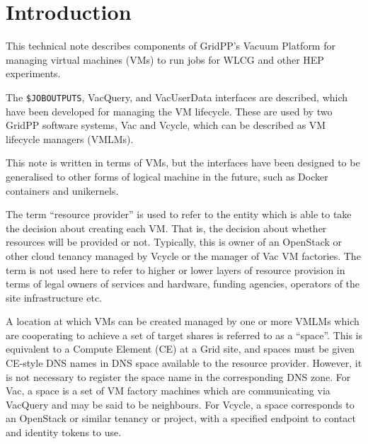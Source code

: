 \documentclass[12pt,a4paper]{article}
\begin{document}
\cleardoublepage

\renewcommand{\thefootnote}{\arabic{footnote}}
\setcounter{footnote}{0}


\pagestyle{plain} %
\setcounter{page}{1}

\linenumbers

\section{Introduction}
\label{sec:Introduction}

This technical note describes components of GridPP's Vacuum Platform for 
managing virtual machines (VMs) to run jobs for WLCG and other HEP 
experiments.

The \texttt{\$JOBOUTPUTS}, VacQuery, and VacUserData interfaces are described, 
which have been developed for managing the VM lifecycle. These are used 
by two GridPP software systems, Vac and Vcycle, which can be described 
as VM lifecycle managers (VMLMs).

This note is written in terms of VMs, but the interfaces have been 
designed to be generalised to other forms of logical machine in the
future, such as Docker containers and unikernels.

The term ``resource provider'' is used to refer to the entity which is 
able to take the decision about creating each VM. That is, the decision 
about whether resources will be provided or not. Typically, this is owner 
of an OpenStack or other cloud tenancy managed by Vcycle or the manager of Vac VM 
factories. The term is not used here to refer to higher or lower layers of resource
provision in terms of legal owners of services and hardware, funding
agencies, operators of the site infrastructure etc.

A location at which VMs can be created managed by one or more VMLMs
which are cooperating to achieve a set of target shares is referred to
as a ``space''. This is equivalent to a Compute Element (CE) at a Grid site,
and spaces must be given CE-style DNS names in DNS space available to the
resource provider. However, it is not necessary to register the 
space name in the corresponding DNS zone. For Vac, a space is a set
of VM factory machines which are communicating via VacQuery and may
be said to be neighbours. For Vcycle, a space corresponds to an 
OpenStack or similar tenancy or project, with a specified endpoint to 
contact and identity tokens to use.
\end{document}
